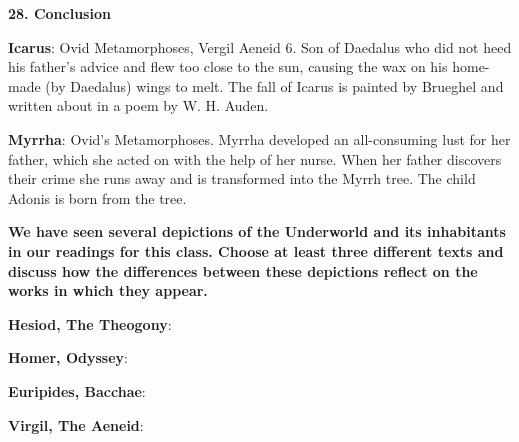 \documentclass{scrartcl}
\begin{document}
\begin{multicols*}{3}
{\bf 28. Conclusion}

{\bf Icarus}: Ovid Metamorphoses, Vergil Aeneid 6. Son of Daedalus who did not heed his father's advice and flew too close to the sun, causing the wax on his home-made (by Daedalus) wings to melt. The fall of Icarus is painted by Brueghel and written about in a poem by W. H. Auden.

{\bf Myrrha}: Ovid's Metamorphoses. Myrrha developed an all-consuming lust for her father, which she acted on with the help of her nurse. When her father discovers their crime she runs away and is transformed into the Myrrh tree. The child Adonis is born from the tree.



{\bf We have seen several depictions of the Underworld and its inhabitants in our readings for this class. Choose at least three different texts and discuss how the differences between these depictions reflect on the works in which they appear.}


{\bf Hesiod, The Theogony}:


{\bf Homer, Odyssey}:


{\bf Euripides, Bacchae}:


{\bf Virgil, The Aeneid}:



\end{multicols*}
\end{document}
